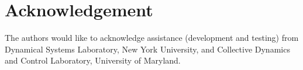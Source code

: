 \documentclass[12pt]{article}
\begin{document}
\begin{enumerate}
\end{enumerate}


\section{Acknowledgement}
The authors would like to acknowledge assistance (development and testing) from Dynamical Systems Laboratory, New York University, and Collective Dynamics and Control Laboratory, University of Maryland.



\end{document}
